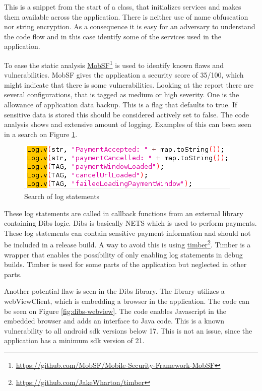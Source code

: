This is a snippet from the start of a class, that initializes services and makes them available across the application. There is neither use of name obfuscation nor string encryption. As a consequence it is easy for an adversary to understand the code flow and in this case identify some of the services used in the application.

To ease the static analysis \href{https://github.com/MobSF/Mobile-Security-Framework-MobSF}{MobSF}\footnote{\href{https://github.com/MobSF/Mobile-Security-Framework-MobSF}{https://github.com/MobSF/Mobile-Security-Framework-MobSF}} is used to identify known flaws and vulnerabilities. MobSF gives the application a security score of 35/100, which might indicate that there is some vulnerabilities. Looking at the report there are several configurations, that is tagged as medium or high severity. One is the allowance of application data backup. This is a flag that defaults to true. If sensitive data is stored this should be considered actively set to false. The code analysis shows and extensive amount of logging. Examples of this can been seen in a search on Figure \ref{fig:log-payments}.

\begin{figure}[htbp]
    \centering
    \includegraphics[width=1\columnwidth]{../static-analysis/pictures/log_payments.png}
    \caption{Search of log statements}
    \label{fig:log-payments}
\end{figure}

These log statements are called in callback functions from an external library containing Dibs logic. Dibs is basically NETS which is used to perform payments. These log statements can contain sensitive payment information and should not be included in a release build. A way to avoid this is using \href{https://github.com/JakeWharton/timber}{timber}\footnote{\href{https://github.com/JakeWharton/timber}{https://github.com/JakeWharton/timber}}. Timber is a wrapper that enables the possibility of only enabling log statements in debug builds. Timber is used for some parts of the application but neglected in other parts.    

Another potential flaw is seen in the Dibs library. The library utilizes a webViewClient, which is embedding a browser in the application. The code can be seen on Figure \ref{fig:dibs-webview}. The code enables Javascript in the embedded browser and adds an interface to Java code. This is a known vulnerability to all android sdk versions below 17\cite{avg-webview-explot}. This is not an issue, since the application has a minimum sdk version of 21.    

